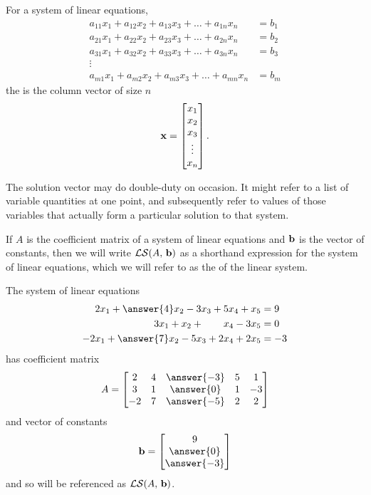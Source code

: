 \documentclass{ximera}
\begin{document}
\begin{definition}
For a system of linear equations,
\begin{align*}
a_{11}x_1+a_{12}x_2+a_{13}x_3+\dots+a_{1n}x_n&=b_1\\
a_{21}x_1+a_{22}x_2+a_{23}x_3+\dots+a_{2n}x_n&=b_2\\
a_{31}x_1+a_{32}x_2+a_{33}x_3+\dots+a_{3n}x_n&=b_3\\
\vdots&\\
a_{m1}x_1+a_{m2}x_2+a_{m3}x_3+\dots+a_{mn}x_n&=b_m
\end{align*}
the  is the column vector of size $n$
\[
\mathbf{x}=
\begin{bmatrix}
x_1\\
x_2\\
x_3\\
\vdots\\
x_n\\
\end{bmatrix}.\]
\end{definition}

The solution vector may do double-duty on occasion.  It might refer to
a list of variable quantities at one point, and subsequently refer to
values of those variables that actually form a particular solution to
that system.

\begin{definition}
If $A$ is the coefficient matrix of a system of linear equations and $\mathbf{b}$ is the vector of constants, then we will write $\mathcal{LS}\!\left(A,\,\mathbf{b}\right)$ as a shorthand expression for the  system of linear equations, which we will refer to as the  of the linear system.
\end{definition}

\begin{example}
The system of linear equations
\begin{align*}
2x_1+\answer{4}x_2-3x_3+5x_4+x_5&=9\\
3x_1+x_2+\quad\quad x_4-3x_5&=0\\
-2x_1+\answer{7}x_2-5x_3+2x_4+2x_5&=-3
\end{align*}
has coefficient matrix
\[
A=
\begin{bmatrix}
2 & 4 & \answer{-3} & 5 & 1\\
3 & 1 & \answer{0} & 1 & -3\\
-2 & 7 & \answer{-5} & 2 & 2
\end{bmatrix}
\]
and vector of constants
\[
\vect{b}=\colvector{9\\\answer{0}\\\answer{-3}}
\]
and so will be referenced as $\mathcal{LS}\!\left(A,\,\mathbf{b}\right)$.
\end{example}
\end{document}
